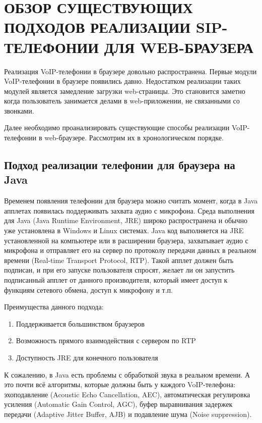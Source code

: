 \chapter{ОБЗОР СУЩЕСТВУЮЩИХ ПОДХОДОВ РЕАЛИЗАЦИИ SIP-ТЕЛЕФОНИИ ДЛЯ WEB-БРАУЗЕРА}
\label{chapter:analysis}

Реализация VoIP-телефонии в браузере довольно распространена. Первые модули VoIP-телефонии в браузере появились давно. Недостатком реализации таких модулей является замедление загрузки web-страницы. Это становится заметно когда пользователь занимается делами в web-приложении, не связанными со звонками.

Далее необходимо проанализировать существующие способы реализации VoIP-телефонии в web-браузере. Рассмотрим их в хронологическом порядке.

\section{Подход реализации телефонии для браузера на Java}

Временем появления телефонии для браузера можно считать момент, когда в Java апплетах появилась поддерживать захвата аудио с микрофона. Среда выполнения для Java (Java Runtime Environment, JRE) широко распространена и обычно уже установлена в Windows и Linux системах.\cite{webrtc_flash_java} Java код выполняется на JRE установленной на компьютере или в расширении браузера, захватывает аудио с микрофона и отправляет его на сервер по протоколу передачи данных в реальном времени (Real-time Transport Protocol, RTP). Такой апплет должен быть подписан, и при его запуске пользователя спросят, желает ли он запустить подписанный апплет от данного производителя, который имеет доступ к функциям сетевого обмена, доступ к микрофону и т.п.

Преимущества данного подхода:
\begin{enumerate}
\item Поддерживается большинством браузеров
\item Возможность прямого взаимодействия с сервером по RTP
\item Доступность JRE для конечного пользователя
\end{enumerate}

К сожалению, в Java есть проблемы с обработкой звука в реальном времени. А это почти всё алгоритмы, которые должны быть у каждого VoIP-телефона: эхоподавление (Acoustic Echo Cancellation, AEC), автоматическая регулировка усиления (Automatic Gain Control, AGC), буфер выравнивания задержек передачи (Adaptive Jitter Buffer, AJB) и подавление шума (Noise suppression).

